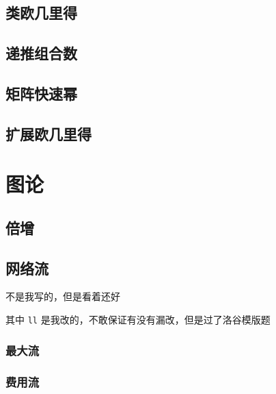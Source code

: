 \documentclass{article}
\begin{document}
\subsection{类欧几里得}

\subsection{递推组合数}



\subsection{矩阵快速幂} %



\subsection{扩展欧几里得} %



\section{图论}

\subsection{倍增}



\subsection{网络流}

不是我写的，但是看着还好

其中 \lstinline{ll} 是我改的，不敢保证有没有漏改，但是过了洛谷模版题

\subsubsection{最大流}



\subsubsection{费用流}
\end{document}
